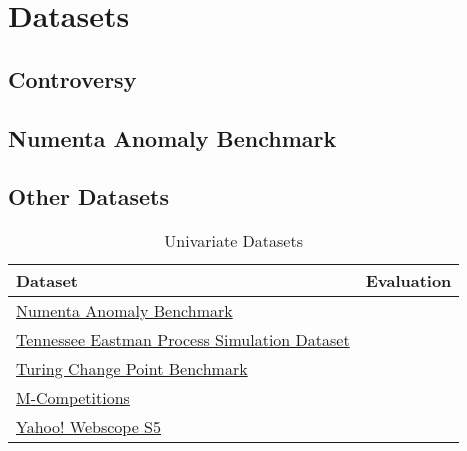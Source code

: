 \section{Datasets}
\subsection{Controversy}
\blindtext[2]

\subsection{Numenta Anomaly Benchmark}
\blindtext[4]

\subsection{Other Datasets}
\blindtext[2]

\begin{table}[h]\centering
        \begin{tabular}{ll}
            Dataset                                                                                                                             & Evaluation    \\\midrule
            \href{https://github.com/numenta/NAB}{Numenta Anomaly Benchmark}                                                                    &               \\\addlinespace
            \href{https://www.kaggle.com/averkij/tennessee-eastman-process-simulation-dataset}{Tennessee Eastman Process Simulation Dataset}    &               \\\addlinespace
            \href{https://github.com/alan-turing-institute/TCPDBench}{Turing Change Point Benchmark}                                            &               \\\addlinespace
            \href{https://en.wikipedia.org/wiki/Makridakis\_Competitions}{M-Competitions}                                                       &               \\\addlinespace
            \href{https://webscope.sandbox.yahoo.com/catalog.php?datatype=s\&did=70}{Yahoo! Webscope S5}                                        &               \\
        \end{tabular}
    \caption{Univariate Datasets}\label{tab:datasets}
\end{table}

